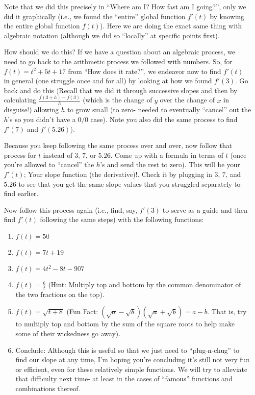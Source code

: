 \documentclass{ximera}
\begin{document}
Note that we did this precisely in ``Where am I? How fast am I going?'', only we did it graphically (i.e., we found the ``entire'' global function $f'(t)$ by knowing the entire global function $f(t)$).   Here we are doing the exact same thing with algebraic notation (although we did so ``locally'' at specific points first).

How should we do this?  If we have a question about an algebraic process, we need to go back to the arithmetic process we followed with numbers.  So, for $f(t) = t^2+5t+17$ from ``How does it rate?'', we endeavor now to find $f'(t)$ in general (one struggle once and for all) by looking at how we found  $f'(3)$.  Go back and do this (Recall that we did it through successive slopes and then by calculating $\frac{f(3+h)- f(3)}{h}$ (which is the change of $y$ over the change of $x$ in disguise!) allowing $h$ to grow small (to zero- needed to eventually ``cancel'' out the $h$'s so you didn't have a $0/0$ case).  Note you also did the same process to find $f'(7)$ and  $f'(5.26)$).

Because you keep following the same process over and over, now follow that process for $t$ instead of $3$, $7$, or $5.26$.  Come up with a formula in terms of $t$ (once you're allowed to ``cancel'' the $h$'s and send the rest to zero).  This will be your  $f'(t)$;  Your slope function (the derivative)!.  Check it by plugging in $3$, $7$, and $5.26$ to see that you get the same slope values that you struggled separately to find earlier.

\begin{question} 
Now follow this process again (i.e., find, say, $f'(3)$ to serve as a guide and then find $f'(t)$ following the same steps) with the following functions:
\begin{enumerate}
\item $f(t) = 50$     
\item $f(t) = 7t+19$     
\item $f(t) = 4t^2-8t-907$  
\item $f(t) = \frac{6}{t}$  (Hint:  Multiply top and bottom by the common denominator of the two fractions on the top).
\item $f(t) = \sqrt{t+8}$  (Fun Fact: $(\sqrt{a} - \sqrt{b})(\sqrt{a} + \sqrt{b}) = a-b$.   That is, try to multiply top and bottom by the sum of the square roots to help make some of their wickedness go away).
\item   Conclude:  Although this is useful so that we just need to ``plug-n-chug'' to find our slope at any time, I'm hoping you're concluding it's still not very fun or efficient, even for these relatively simple functions.  We will try to alleviate that difficulty next time- at least in the cases of ``famous'' functions and combinations thereof.
\end{enumerate}
\end{question}
\end{document}
